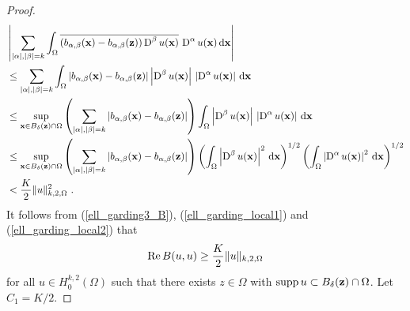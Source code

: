 \begin{proof}
\begin{align}
&\left| \sum_{|\alpha|,|\beta|= k} \int_{\Omega}
\overline{\left(b_{\alpha,\beta}(\mathbf{x})-b_{\alpha,\beta}(\mathbf{z})\right)
\operatorname{D}^\beta u(\mathbf{x})}\, \operatorname{D}^\alpha u(\mathbf{x}) \,\mathrm{d}{\mathbf{x}} \right|
\nonumber \\
& \leq \sum_{|\alpha|,|\beta|= k} \int_{\Omega}
\left|b_{\alpha,\beta}(\mathbf{x})-b_{\alpha,\beta}(\mathbf{z})\right|
\left| \operatorname{D}^\beta u(\mathbf{x})\right|\,
\left| \operatorname{D}^\alpha u(\mathbf{x}) \right|\,\mathrm{d}{\mathbf{x}} \nonumber \\
& \leq \sup_{\mathbf{x}\in B_\delta(\mathbf{z}) \cap \Omega}
\left( \sum_{|\alpha|,|\beta|= k}
\left|b_{\alpha,\beta}(\mathbf{x})-b_{\alpha,\beta}(\mathbf{z})\right| \right)
\int_{\Omega} \left| \operatorname{D}^\beta u(\mathbf{x})\right|\,
\left| \operatorname{D}^\alpha u(\mathbf{x}) \right|\,\mathrm{d}{\mathbf{x}} \nonumber \\
& \leq \sup_{\mathbf{x}\in B_\delta(\mathbf{z}) \cap \Omega}
\left( \sum_{|\alpha|,|\beta|= k}
\left|b_{\alpha,\beta}(\mathbf{x})-b_{\alpha,\beta}(\mathbf{z})\right| \right)
\left( \int_{\Omega} \left| \operatorname{D}^\beta u(\mathbf{x})\right|^2 \,\mathrm{d}{\mathbf{x}}
\right)^{1/2}
\left( \int_{\Omega} \left| \operatorname{D}^\alpha u(\mathbf{x}) \right|^2 \,\mathrm{d}{\mathbf{x}}
\right)^{1/2} \nonumber \\
& < \frac{K}{2} \|u\|_{k,2,\Omega}^2 \ . \label{ell_garding_local2}
\end{align}
It follows from (\ref{ell_garding3_B}), (\ref{ell_garding_local1}) and
(\ref{ell_garding_local2}) that
\begin{equation} \label{ell_garding3_delta}
\operatorname{Re} B(u,u) \geq \frac{K}{2} \|u\|_{k,2,\Omega}
\end{equation}
for all $\displaystyle u \in H^{k,2}_0(\Omega)$ such that there
exists $z\in \Omega$ with $\operatorname{supp} u \subset B_{\delta}(\mathbf{z}) \cap \Omega$.
Let $C_1=K/2$.


\end{proof}

